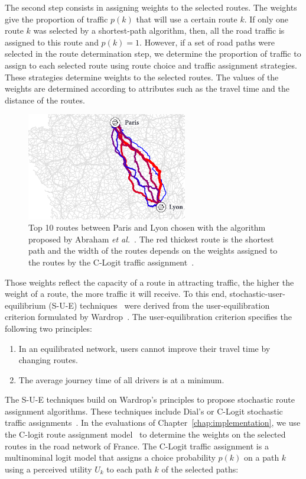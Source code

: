The second step consists in assigning weights to the selected routes. The weights give the proportion of traffic $p(k)$ that will use a certain route $k$. If only one route $k$ was selected by a shortest-path algorithm, then, all the road traffic is assigned to this route and $p(k) = 1$. However, if a set of road paths were selected in the route determination step, we determine the proportion of traffic to assign to each selected route using route choice and traffic assignment strategies. These strategies determine weights to the selected routes. The values of the weights are determined according to attributes such as the travel time and the distance of the routes. 
\begin{figure}
    \includegraphics[width=7cm]{figures/route-assignment.pdf}
    \caption{Top 10 routes between Paris and Lyon chosen with the algorithm proposed by Abraham \textit{et al.}~\cite{abraham2013alternative}. The red thickest route is the shortest path and the width of the routes depends on the weights assigned to the routes by the C-Logit traffic assignment~\cite{cascetta1996modified}.}
    \label{fig:route-assignment}
\end{figure}
Those weights reflect the capacity of a route in attracting traffic, the higher the weight of a route, the more traffic it will receive. To this end, stochastic-user-equilibrium (S-U-E) techniques~\cite{daganzo1977stochastic} were derived from the user-equilibration criterion formulated by Wardrop~\cite{wardrop1952some}. The user-equilibration criterion specifies the following two principles:
\begin{enumerate}
    \item In an equilibrated network, users cannot improve their travel time by changing routes.
    \item The average journey time of all drivers is at a minimum.
\end{enumerate}
The S-U-E techniques build on Wardrop's principles to propose stochastic route assignment algorithms. These techniques include Dial's or C-Logit stochastic traffic assignments~\cite{dial1971probabilistic,cascetta1996modified}.  In the evaluations of Chapter~\ref{chap:implementation}, we use the C-logit route assignment model~\cite{cascetta1996modified} to determine the weights on the selected routes in the road network of France. The C-Logit traffic assignment is a multinominal logit model that assigns a choice probability $p(k)$ on a path $k$ using a perceived utility $U_k$ to each path $k$ of the selected paths:
